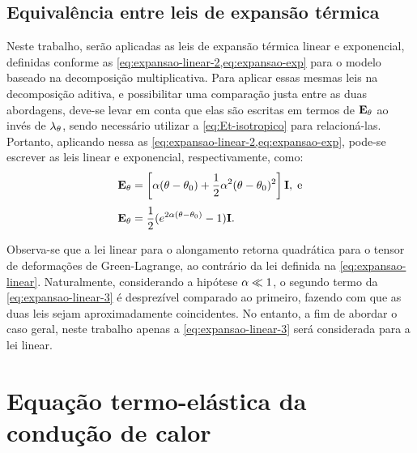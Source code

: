 \documentclass[Tese.tex]{subfiles}
\begin{document}
\subsection{Equivalência entre leis de expansão térmica}\label{sec:equivalencia-leis-expansao}

Neste trabalho, serão aplicadas as leis de expansão térmica linear e exponencial, definidas conforme as \cref{eq:expansao-linear-2,eq:expansao-exp} para o modelo baseado na decomposição multiplicativa. Para aplicar essas mesmas leis na decomposição aditiva, e possibilitar uma comparação justa entre as duas abordagens, deve-se levar em conta que elas são escritas em termos de $\mathbf{E}_{\theta}$ ao invés de $\lambda_{\theta}$, sendo necessário utilizar a \cref{eq:Et-isotropico} para relacioná-las. Portanto, aplicando nessa as \cref{eq:expansao-linear-2,eq:expansao-exp}, pode-se escrever as leis linear e exponencial, respectivamente, como:
\begin{align}
&\mathbf{E}_{\theta} = \left[\alpha(\theta-\theta_0) + \dfrac{1}{2}\alpha^2(\theta-\theta_0)^2\right]\mathbf{I}, \text{\;e} \label{eq:expansao-linear-3}\\[0.1cm]
&\mathbf{E}_{\theta} = \dfrac{1}{2}(e^{2\alpha(\theta-\theta_0)}-1)\mathbf{I}. \label{eq:expansao-exp-2}
\end{align}

Observa-se que a lei linear para o alongamento retorna quadrática para o tensor de deformações de Green-Lagrange, ao contrário da lei definida na \cref{eq:expansao-linear}. Naturalmente, considerando a hipótese $\alpha\ll 1$, o segundo termo da \cref{eq:expansao-linear-3} é desprezível comparado ao primeiro, fazendo com que as duas leis sejam aproximadamente coincidentes. No entanto, a fim de abordar o caso geral, neste trabalho apenas a \cref{eq:expansao-linear-3} será considerada para a lei linear.

%

\section{Equação termo-elástica da condução de calor}\label{sec:conducao-calor}
\end{document}

